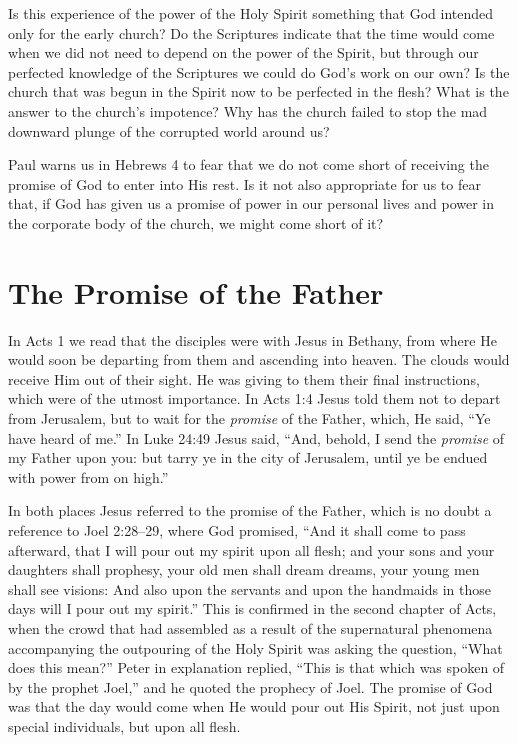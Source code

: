 Is this experience of the power of the Holy Spirit something
that God intended only for the early church? Do the
Scriptures indicate that the time would come when we did
not need to depend on the power of the Spirit, but through
our perfected knowledge of the Scriptures we could do
God’s work on our own? Is the church that was begun in the
Spirit now to be perfected in the flesh? What is the answer
to the church’s impotence? Why has the church failed to
stop the mad downward plunge of the corrupted world
around us?

Paul warns us in Hebrews 4 to fear that we do not come
short of receiving the promise of God to enter into His rest.
Is it not also appropriate for us to fear that, if God has given
us a promise of power in our personal lives and power in
the corporate body of the church, we might come short of
it?


\section*{The Promise of the Father}

In Acts 1 we read that the disciples were with Jesus
in Bethany, from where He would soon be departing from
them and ascending into heaven. The clouds would receive
Him out of their sight. He was giving to them their final
instructions, which were of the utmost importance. In Acts
1:4 Jesus told them not to depart from Jerusalem, but to wait
for the \emph{promise} of the Father, which, He said, “Ye have heard
of me.” In Luke 24:49 Jesus said, “And, behold, I send the
\emph{promise} of my Father upon you: but tarry ye in the city of
Jerusalem, until ye be endued with power from on high.”

In both places Jesus referred to the promise of the Father,
which is no doubt a reference to Joel 2:28–29, where God
promised, “And it shall come to pass afterward, that I
will pour out my spirit upon all flesh; and your sons and
your daughters shall prophesy, your old men shall dream
dreams, your young men shall see visions: And also upon
the servants and upon the handmaids in those days will I
pour out my spirit.” This is confirmed in the second chapter
of Acts, when the crowd that had assembled as a result of
the supernatural phenomena accompanying the outpouring
of the Holy Spirit was asking the question, “What does
this mean?” Peter in explanation replied, “This is that which
was spoken of by the prophet Joel,” and he quoted the
prophecy of Joel. The promise of God was that the day
would come when He would pour out His Spirit, not just
upon special individuals, but upon all flesh.


